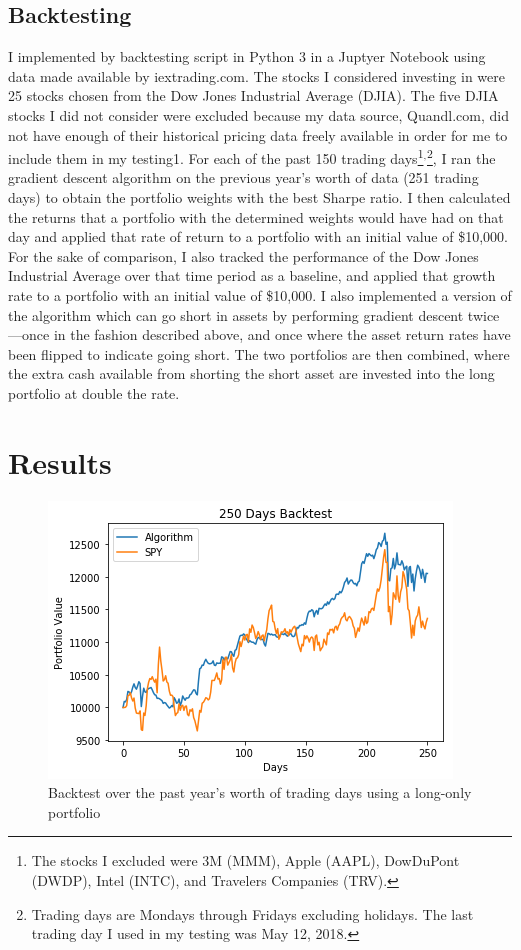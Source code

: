 \documentclass{article}
\begin{document}
\subsection{Backtesting}
I implemented by backtesting script in Python 3 in a Juptyer Notebook using data made available by iextrading.com. The stocks I considered investing in were 25 stocks chosen from the Dow Jones Industrial Average (DJIA). The five DJIA stocks I did not consider were excluded because my data source, Quandl.com, did not have enough of their historical pricing data freely available in order for me to include them in my testing1.
For each of the past 150 trading days\footnote{The stocks I excluded were 3M (MMM), Apple (AAPL), DowDuPont (DWDP), Intel (INTC), and Travelers Companies (TRV).}$^,$\footnote{Trading days are Mondays through Fridays excluding holidays. The last trading day I used in my testing was May 12, 2018.}, I ran the gradient descent algorithm on the previous year’s worth of data (251 trading days) to obtain the portfolio weights with the best Sharpe ratio.
I then calculated the returns that a portfolio with the determined weights would have had on that day and applied that rate of return to a portfolio with an initial value of \$10,000. For the sake of comparison, I also tracked the performance of the Dow Jones Industrial Average over that time period as a baseline, and applied that growth rate to a portfolio with an initial value of \$10,000.  I also implemented a version of the algorithm which can go short in assets by performing gradient descent twice---once in the fashion described above, and once where the asset return rates have been flipped to indicate going short.  The two portfolios are then combined, where the extra cash available from shorting the short asset are invested into the long portfolio at double the rate.

\section{Results}
\begin{figure}[h!]%
\includegraphics[scale=0.9]{back1}
\caption{Backtest over the past year's worth of trading days using a long-only portfolio}
\end{figure}
\end{document}

